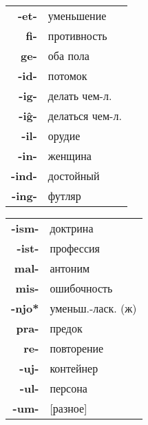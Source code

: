\documentclass{article}
\begin{document}
\begin{tabular}{>{\bfseries}rl}
-et- & уменьшение \\
fi- & противность \\
ge- & оба пола \\
-id- & потомок \\
-ig- & делать чем-л. \\
-iĝ- & делаться чем-л. \\
-il- & орудие \\
-in- & женщина \\
-ind- & достойный \\
-ing- & футляр \\
\end{tabular}
\begin{tabular}{>{\bfseries}rl}
-ism- & доктрина \\
-ist- & профессия \\
mal- & антоним \\
mis- & ошибочность \\
-njo* & уменьш.-ласк. (ж) \\
pra- & предок \\
re- & повторение \\
-uj- & контейнер \\
-ul- & персона \\
-um- & [разное] \\
\end{tabular}
\end{document}

